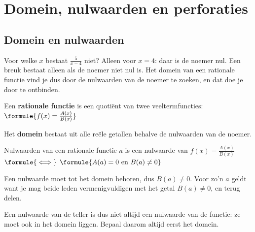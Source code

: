 \begin{oefeningen}[Start]

\end{oefeningen}

\section{Domein, nulwaarden en perforaties}

\subsection{Domein en nulwaarden}

Voor welke $x$ bestaat $\frac{5}{x - 4}$ niet? Alleen voor $x = 4$: daar is de noemer nul. Een breuk bestaat alleen als de noemer niet nul is. Het domein van een rationale functie vind je dus door de nulwaarden van de noemer te zoeken, en dat doe je door te ontbinden.

\begin{theorie}
Een \textbf{\textcolor{accent}{rationale functie}} is een quotiënt van twee veeltermfuncties: \quad $\formule{f(x) = \frac{A(x)}{B(x)}}$

Het \textbf{\textcolor{accent}{domein}} bestaat uit alle reële getallen behalve de nulwaarden van de noemer.

\begin{stelling}{Nulwaarden van een rationale functie}
$a$ is een nulwaarde van $f(x) = \frac{A(x)}{B(x)}$ \quad $\formule{\iff}$ \quad $\formule{A(a) = 0 \text{ en } B(a) \neq 0}$
\end{stelling}

\begin{bewijs}
Een nulwaarde moet tot het domein behoren, dus $B(a) \neq 0$. Voor zo'n $a$ geldt
want je mag beide leden vermenigvuldigen met het getal $B(a) \neq 0$, en terug delen.
\end{bewijs}
\end{theorie}

Een nulwaarde van de teller is dus niet altijd een nulwaarde van de functie: ze moet ook in het domein liggen. Bepaal daarom altijd eerst het domein.


